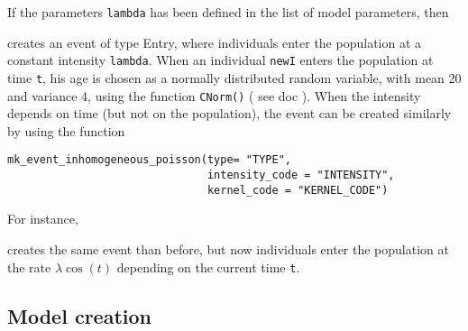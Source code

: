 If the parameters \texttt{lambda} has been defined in the list of model parameters, then

\begin{Shaded}
\begin{Highlighting}[]
\NormalTok{(} \NormalTok{, } \NormalTok{, }
\NormalTok{)}
\end{Highlighting}
\end{Shaded}

creates an event of type Entry, where individuals enter the population at a constant intensity \texttt{lambda}. When an individual \texttt{newI} enters the population at time \texttt{t}, his age is chosen as a normally distributed random variable, with mean 20 and variance 4, using the function \texttt{CNorm()} ({ see doc }).
When the intensity depends on time (but not on the population), the event can be created similarly by using the function

\begin{verbatim}
mk_event_inhomogeneous_poisson(type= "TYPE",   
                               intensity_code = "INTENSITY",   
                               kernel_code = "KERNEL_CODE")
\end{verbatim}

For instance,

\begin{Shaded}
\begin{Highlighting}[]
\NormalTok{(} \NormalTok{,    }
                                \NormalTok{, }
\NormalTok{)}
\end{Highlighting}
\end{Shaded}

creates the same event than before, but now individuals enter the population at the rate \(\lambda \cos(t)\) depending on the current time \texttt{t}.

\hypertarget{Modelcreation}{%
\subsection{Model creation}\label{Modelcreation}}

